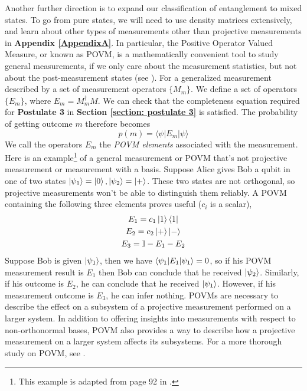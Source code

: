 Another further direction is to expand our classification of entanglement to mixed states. To go from pure states, we will need to use density matrices extensively, and learn about other types of measurements other than projective measurements in \textbf{Appendix \ref{AppendixA}}. In particular, the Positive Operator Valued Measure, or known as POVM, is a mathematically convenient tool to study general measurements, if we only care about the measurement statistics, but not about the post-measurement states (see \cite{Nielsen}). For a generalized measurement described by a set of measurement operators $\{M_m\}$. We define a set of operators $\{{E_m}\}$, where
$E_m=M_m^\dagger M$. We can check that the completeness equation required for \textbf{Postulate 3} in \textbf{Section \ref{section: postulate 3}} is satisfied. The probability of getting outcome $m$ therefore becomes 
$$p(m)=\langle \psi | E_m | \psi \rangle$$
We call the operators ${{E_m}}$ the \textit{POVM elements} associated with the measurement.
Here is an example\footnote{This example is adapted from page 92 in \cite{Nielsen}.} of a general measurement or POVM that's not projective measurement or measurement with a basis. Suppose Alice gives Bob a qubit in one of two states $\ket{\psi_1}=\ket{0}, \ket{\psi_2}=\ket{+}$. These two states are not orthogonal, so projective measurements won't be able to distinguish them reliably. A POVM containing the following three elements proves useful ($c_i$ is a scalar),
\begin{gather}
    E_1=c_1\ket{1}\bra{1}\\
    E_2=c_2\ket{+}\ket{-}\\
    E_3=\mathbb{I}-E_1-E_2
\end{gather}
Suppose Bob is given $\ket{\psi_1}$, then we have $\braket{\psi_1|E_1|\psi_1}=0$, so if his POVM measurement result is $E_1$ then Bob can conclude that he received $\ket{\psi_2}$. Similarly, if his outcome is $E_2$, he can conclude that he received $\ket{\psi_1}$. However, if his measurement outcome is $E_3$, he can infer nothing. 
POVMs are necessary to describe the effect on a subsystem of a projective measurement performed on a larger system. In addition to offering insights into measurements with respect to non-orthonormal bases, POVM also provides a way to describe how a projective measurement on a larger system affects its subsystems. For a more thorough study on POVM, see \cite{brandt1999positive}.



